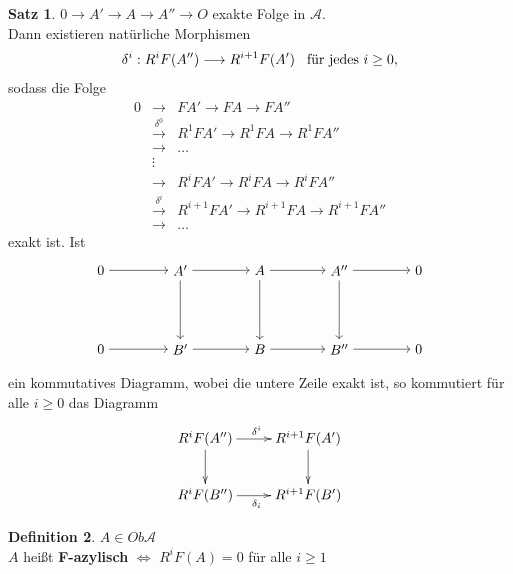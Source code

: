 \documentclass[10pt,a4paper,numbers=endperiod]{scrreprt}
\theoremstyle{definition}
\newtheorem{satz}{Satz}[section]
\newtheorem{defi}[satz]{Definition}
\begin{document}
\begin{satz}
	$0 \to A' \to A \to A'' \to O$ exakte Folge in $\mathcal{A}$.\\
	Dann existieren natürliche Morphismen \begin{align*}
		\delta^i: R^iF(A'') \longrightarrow R^{i+1}F(A') \hspace*{3mm} \text{für jedes } i \geq 0,
	\end{align*}
	sodass die Folge \begin{eqnarray*}
		0 &\to& FA' \to FA \to FA''\\
		&\overset{\delta^0}{\to}& R^1FA' \to R^1FA \to R^1FA''\\
		&\to& \ldots\\
		&\vdots&\\
		&\to& R^iFA' \to R^iFA \to R^iFA''\\
		&\overset{\delta^i}{\to}& R^{i+1}FA' \to R^{i+1}FA \to R^{i+1}FA''\\
		&\to& \ldots
	\end{eqnarray*}
	exakt ist. Ist \begin{align*}
	\begin{tikzpicture}{
	\node (30) at (1,2) {$0$};
	\node (31) at (3,2) {$ A' $};
	\node (32) at (5,2) {$ A $};
	\node (33) at (7,2) {$ A'' $};
	\node (34) at (9,2) {$ 0 $};
	\node (40) at (1,0) {$ 0 $};
	\node (41) at (3,0) {$ B' $};
	\node (42) at (5,0) {$ B $};
	\node (43) at (7,0) {$ B'' $};
	\node (44) at (9,0) {$ 0 $};
	\draw[->] (30) edge (31);
	\draw[->] (31) edge (32);
	\draw[->] (32) edge (33);
	\draw[->] (33) edge (34);
	\draw[->] (40) edge (41);
	\draw[->] (41) edge (42);
	\draw[->] (42) edge (43);
	\draw[->] (43) edge (44);
	\draw[->] (31) edge (41);
	\draw[->] (32) edge (42);
	\draw[->] (33) edge (43);}
	\end{tikzpicture}
	\end{align*}
	ein kommutatives Diagramm, wobei die untere Zeile exakt ist, so kommutiert für alle $i \geq 0$ das Diagramm \begin{align*}
	\begin{xy}
	\xymatrix{
		R^iF(A'') \ar[r]^{\delta^i} \ar[d]   &   R^{i+1}F(A') \ar[d]\\
		R^iF(B'') \ar[r]_{\delta_i} & R^{i+1}F(B') 
	}
	\end{xy}
	\end{align*}
\end{satz}

\begin{defi}
	$A \in Ob \mathcal{A}$\\
	$A$ heißt \textbf{F-azylisch} $\Leftrightarrow$ $R^iF(A) = 0$ für alle $i \geq 1$
\end{defi}
\end{document}
